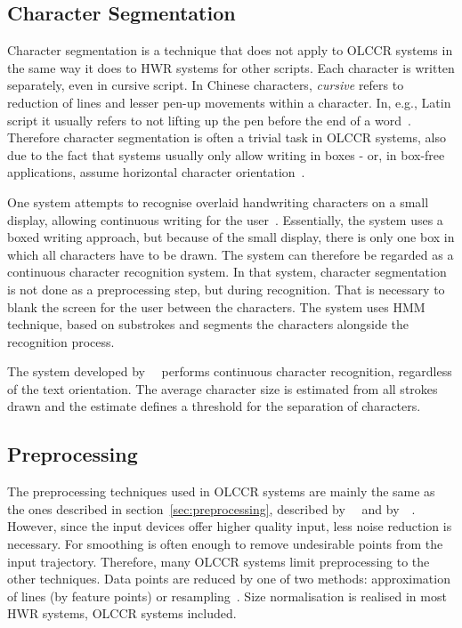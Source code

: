 \subsection{Character Segmentation}
\label{sec:olccr:charactersegmentation}

Character segmentation is a technique that does not apply to OLCCR systems in
the same way it does to HWR systems for other scripts. Each character is
written separately, even in cursive script. In Chinese characters, \emph{cursive}
refers to reduction of lines and lesser pen-up movements within a character.
In, e.g., Latin script it usually refers to not lifting up the pen before the end
of a word~. Therefore character segmentation is often a
trivial task in OLCCR systems, also due to the fact that systems usually only
allow writing in boxes - or, in box-free applications, assume horizontal 
character orientation~.

One system attempts to recognise overlaid handwriting characters on a small 
display, allowing continuous writing for the user~.
Essentially, the system uses a boxed writing approach, 
but because of the small display, there is only one box in which 
all characters have to be drawn. The system can therefore be regarded as a
continuous character recognition system. In that system, character segmentation 
is not done as a preprocessing step, but during recognition. That is 
necessary to blank the screen for the user between the characters.
The system uses 
HMM technique, based on substrokes and segments the characters alongside the 
recognition process.

The system developed by~~
performs continuous character recognition, regardless of the text orientation.
The average character size is estimated from all strokes drawn and the estimate
defines a threshold for the separation of characters.

\subsection{Preprocessing}
\label{sec:olccr:preprocessing}

The preprocessing techniques used in OLCCR systems are mainly the same as the
ones described in section~\ref{sec:preprocessing}, described 
by~~\citeyear{Tappert1990}
and by~~\citeyear{Santosh2009}. 
However, since the input devices offer higher 
quality input, less noise reduction is necessary. For smoothing is often enough to 
remove undesirable points from the input trajectory. Therefore, many OLCCR 
systems limit preprocessing to the other techniques. Data points are reduced
by one of two methods: approximation of lines (by feature points) or 
resampling~.
Size normalisation is realised in most HWR systems, OLCCR systems included.

